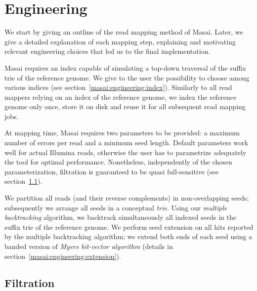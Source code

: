 
\section{Engineering}

We start by giving an outline of the read mapping method of Masai.
Later, we give a detailed explanation of each mapping step, explaining and motivating relevant engineering choices that led us to the final implementation.

Masai requires an index capable of simulating a top-down traversal of the suffix trie of the reference genome.
We give to the user the possibility to choose among various indices (see section~\ref{masai:engineering:index}).
Similarly to all read mappers relying on an index of the reference genome, we index the reference genome only once, store it on disk and reuse it for all subsequent read mapping jobs.

At mapping time, Masai requires two parameters to be provided: a maximum number of errors per read and a minimum seed length.
Default parameters work well for actual Illumina reads, otherwise the user has to parametrize adequately the tool for optimal performance.
Nonetheless, independently of the chosen parameterization, filtration is guaranteed to be quasi full-sensitive (see section~\ref{masai:engineering:seeding}).

We partition all reads (and their reverse complements) in non-overlapping seeds;
subsequently we arrange all seeds in a conceptual \emph{trie}.
Using our \emph{multiple backtracking} algorithm, we backtrack simultaneously all indexed seeds in the suffix trie of the reference genome.
We perform seed extension on all hits reported by the multiple backtracking algorithm;
we extend both ends of each seed using a banded version of \emph{Myers bit-vector algorithm} \citep{Myers1999} (details in section~\ref{masai:engineering:extension}).


\subsection{Filtration}
\label{masai:engineering:seeding}

